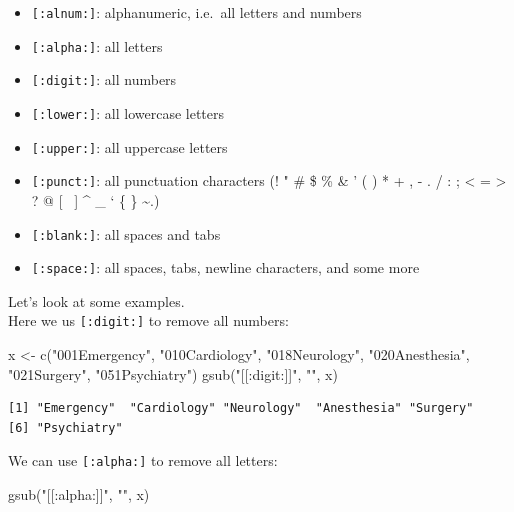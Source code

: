 \documentclass[
]{book}
\newenvironment{Shaded}{\begin{snugshade}}{\end{snugshade}}
\newcommand{\FunctionTok}[1]{\textcolor[rgb]{0.00,0.00,0.00}{#1}}
\newcommand{\NormalTok}[1]{#1}
\newcommand{\OtherTok}[1]{\textcolor[rgb]{0.56,0.35,0.01}{#1}}
\newcommand{\StringTok}[1]{\textcolor[rgb]{0.31,0.60,0.02}{#1}}
\providecommand{\tightlist}{%
  \setlength{\itemsep}{0pt}\setlength{\parskip}{0pt}}
\begin{document}
\begin{itemize}
\tightlist
\item
  \texttt{{[}:alnum:{]}}: alphanumeric, i.e.~all letters and numbers
\item
  \texttt{{[}:alpha:{]}}: all letters
\item
  \texttt{{[}:digit:{]}}: all numbers
\item
  \texttt{{[}:lower:{]}}: all lowercase letters
\item
  \texttt{{[}:upper:{]}}: all uppercase letters
\item
  \texttt{{[}:punct:{]}}: all punctuation characters (! " \# \$ \% \& ' ( ) * + , - . / : ; \textless{} = \textgreater{} ? @ {[} ~{]} \^{} \_ ` \{ \textbar{} \} \textasciitilde.)
\item
  \texttt{{[}:blank:{]}}: all spaces and tabs
\item
  \texttt{{[}:space:{]}}: all spaces, tabs, newline characters, and some more
\end{itemize}

Let's look at some examples.\\
Here we us \texttt{{[}:digit:{]}} to remove all numbers:

\begin{Shaded}
\begin{Highlighting}[]
\NormalTok{x }\OtherTok{\textless{}{-}} \FunctionTok{c}\NormalTok{(}\StringTok{"001Emergency"}\NormalTok{, }\StringTok{"010Cardiology"}\NormalTok{, }\StringTok{"018Neurology"}\NormalTok{, }\StringTok{"020Anesthesia"}\NormalTok{, }
       \StringTok{"021Surgery"}\NormalTok{, }\StringTok{"051Psychiatry"}\NormalTok{)}
\FunctionTok{gsub}\NormalTok{(}\StringTok{"[[:digit:]]"}\NormalTok{, }\StringTok{""}\NormalTok{, x)}
\end{Highlighting}
\end{Shaded}

\begin{verbatim}
[1] "Emergency"  "Cardiology" "Neurology"  "Anesthesia" "Surgery"   
[6] "Psychiatry"
\end{verbatim}

We can use \texttt{{[}:alpha:{]}} to remove all letters:

\begin{Shaded}
\begin{Highlighting}[]
\FunctionTok{gsub}\NormalTok{(}\StringTok{"[[:alpha:]]"}\NormalTok{, }\StringTok{""}\NormalTok{, x)}
\end{Highlighting}
\end{Shaded}
\end{document}
